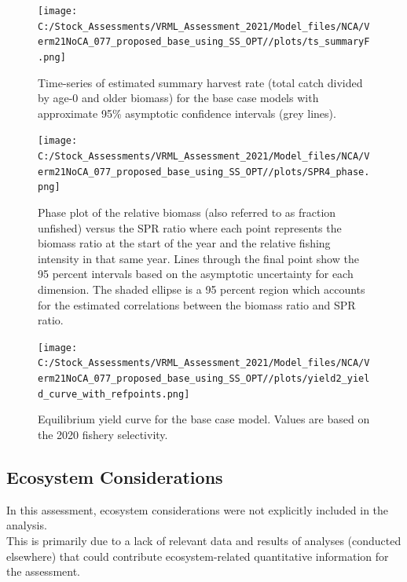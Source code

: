\documentclass[11pt,
  english,
  a4paper,
]{article}
\begin{document}
\begin{figure}
\centering
\texttt{[image: C:/Stock\_Assessments/VRML\_Assessment\_2021/Model\_files/NCA/Verm21NoCA\_077\_proposed\_base\_using\_SS\_OPT//plots/ts\_summaryF.png]}
\caption{Time-series of estimated summary harvest rate (total catch divided by age-0 and older biomass) for the base case models with approximate 95\% asymptotic confidence intervals (grey lines).\label{fig:FmortalityES}}
\end{figure}

\begin{figure}
\centering
\texttt{[image: C:/Stock\_Assessments/VRML\_Assessment\_2021/Model\_files/NCA/Verm21NoCA\_077\_proposed\_base\_using\_SS\_OPT//plots/SPR4\_phase.png]}
\caption{Phase plot of the relative biomass (also referred to as fraction unfished) versus the SPR ratio where each point represents the biomass ratio at the start of the year and the relative fishing intensity in that same year. Lines through the final point show the 95 percent intervals based on the asymptotic uncertainty for each dimension. The shaded ellipse is a 95 percent region which accounts for the estimated correlations between the biomass ratio and SPR ratio.\label{fig:phaseES}}
\end{figure}

\begin{figure}
\centering
\texttt{[image: C:/Stock\_Assessments/VRML\_Assessment\_2021/Model\_files/NCA/Verm21NoCA\_077\_proposed\_base\_using\_SS\_OPT//plots/yield2\_yield\_curve\_with\_refpoints.png]}
\caption{Equilibrium yield curve for the base case model. Values are based on the 2020 fishery selectivity.\label{fig:yield2ES}}
\end{figure}

\FloatBarrier


\hypertarget{ecosystem-considerations}{%
\subsection*{Ecosystem Considerations}\label{ecosystem-considerations}}

\leavevmode\tagmcend\tagstructend

In this assessment, ecosystem considerations were not explicitly included in the analysis.\\
This is primarily due to a lack of relevant data and results of analyses (conducted elsewhere) that could contribute ecosystem-related quantitative information for the assessment.
\end{document}
